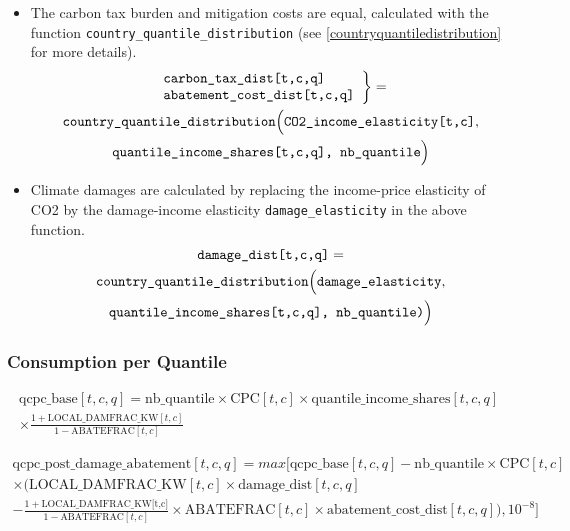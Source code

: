 \documentclass[
]{article}
\providecommand{\tightlist}{%
  \setlength{\itemsep}{0pt}\setlength{\parskip}{0pt}}
\begin{document}
\begin{itemize}
\tightlist
\item 
The carbon tax burden and mitigation costs are equal, calculated with the function \texttt{country\_quantile\_distribution} (see \ref{countryquantiledistribution} for more details).
\begin{multline}
  \left. \begin{array}{l}
  \texttt{carbon\_tax\_dist{[}t,c,q{]}} \\
  \texttt{abatement\_cost\_dist{[}t,c,q{]}}
  \end{array} \right\}
  = \\
  \texttt{country\_quantile\_distribution} \Bigl( \texttt{CO2\_income\_elasticity{[}t,c{]}},\\
  \texttt{quantile\_income\_shares{[}t,c,q{]},\ nb\_quantile} \Bigr)
  \end{multline}

\item Climate damages are calculated by replacing the income-price elasticity of CO2 by the damage-income elasticity
  \texttt{damage\_elasticity} in the above function.
\begin{multline}
  \texttt{damage\_dist{[}t,c,q{]}} = \\
  \texttt{country\_quantile\_distribution} \Bigl( \texttt{damage\_elasticity},\\
  \texttt{quantile\_income\_shares{[}t,c,q{]},\ nb\_quantile)} \Bigr)
\end{multline}

\end{itemize}

\subsubsection{Consumption per Quantile}\label{consumption-per-quantile}

\begin{multline}
  \text{qcpc\_base}[t,c,q] = \text{nb\_quantile} \times \text{CPC}[t,c] \times \text{quantile\_income\_shares}[t,c,q]  \\
 \times \frac{1 + \text{LOCAL\_DAMFRAC\_KW}[t,c]}{1 - \text{ABATEFRAC}[t,c]} 
\end{multline}


\begin{multline}
  \text{qcpc\_post\_damage\_abatement}[t,c,q] = max \biggl[\text{qcpc\_base}[t,c,q] - \text{nb\_quantile} \times \text{CPC}[t,c] \\
 \times \biggl(\text{LOCAL\_DAMFRAC\_KW}[t,c] \times \text{damage\_dist}[t,c,q] \\
 - \frac{1 + \text{LOCAL\_DAMFRAC\_KW[t,c]}}{1 - \text{ABATEFRAC}[t,c]} \times \text{ABATEFRAC}[t,c] \times \text{abatement\_cost\_dist}[t,c,q]\biggr), 10^{-8} \biggr] 
\end{multline}
\end{document}
